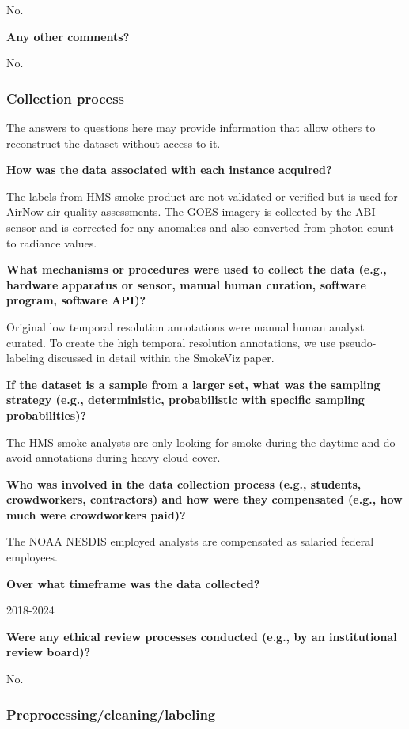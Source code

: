 \documentclass{article}
\begin{document}
No.

\textbf{Any other comments?}

No.


\subsubsection{Collection process}

The answers to questions here may provide information that allow others to reconstruct the dataset without access to it.

\textbf{How was the data associated with each instance acquired?}

The labels from HMS smoke product are not validated or verified but is used for AirNow air quality assessments. The GOES imagery is collected by the ABI sensor and is corrected for any anomalies and also converted from photon count to radiance values.

\textbf{What mechanisms or procedures were used to collect the data (e.g., hardware apparatus or sensor, manual human curation, software program, software API)?}

Original low temporal resolution annotations were manual human analyst curated. To create the high temporal resolution annotations, we use pseudo-labeling discussed in detail within the SmokeViz paper.

\textbf{If the dataset is a sample from a larger set, what was the sampling strategy (e.g., deterministic, probabilistic with specific sampling probabilities)?}

The HMS smoke analysts are only looking for smoke during the daytime and do avoid annotations during heavy cloud cover.

\textbf{Who was involved in the data collection process (e.g., students, crowdworkers, contractors) and how were they compensated (e.g., how much were crowdworkers paid)?}

The NOAA NESDIS employed analysts are compensated as salaried federal employees.

\textbf{Over what timeframe was the data collected?}

2018-2024

\textbf{Were any ethical review processes conducted (e.g., by an institutional review board)?}

No.


\subsubsection{Preprocessing/cleaning/labeling}
\end{document}
